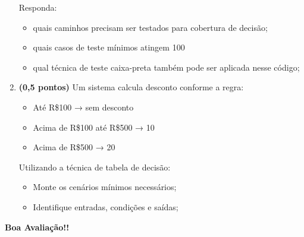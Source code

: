 \documentclass[a4paper,12pt]{article}
\begin{document}
\begin{multicols}{2}
\begin{enumerate}[leftmargin=*]
Responda:

\begin{itemize}[itemsep=0pt, topsep=0pt]
    \item quais caminhos precisam ser testados para cobertura de decisão;
    \item quais casos de teste mínimos atingem 100%
    \item qual técnica de teste caixa-preta também pode ser aplicada nesse código;
\end{itemize}

\vspace{0.2cm}

\item \textbf{(0,5 pontos)} Um sistema calcula desconto conforme a regra:

\begin{itemize}[itemsep=0pt, topsep=0pt]
    \item Até R\$100 → sem desconto
    \item Acima de R\$100 até R\$500 → 10%
    \item Acima de R\$500 → 20%
\end{itemize}

Utilizando a técnica de tabela de decisão:

\begin{itemize}[itemsep=0pt, topsep=0pt]
    \item Monte os cenários mínimos necessários;
    \item Identifique entradas, condições e saídas;
\end{itemize}

\end{enumerate}

\end{multicols}

\vfill

\begin{center}
\textbf{Boa Avaliação!!}
\end{center}
\end{document}
